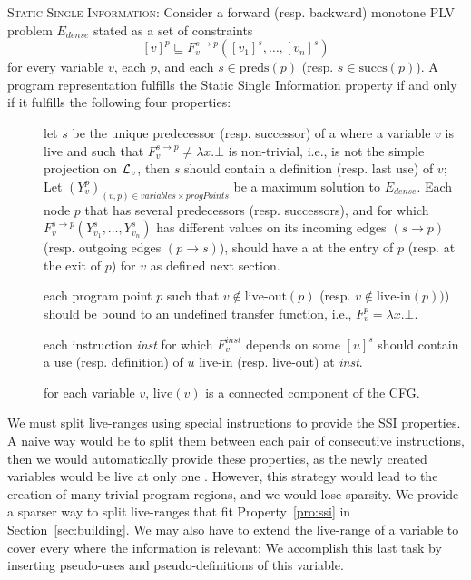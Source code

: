 {\begin{property}[SSI]
\label{pro:ssi}\textsc{Static Single Information:}
Consider a forward (resp.  backward) monotone PLV problem $E_\textit{dense}$ 
stated as a set of constraints
$$[v]^p \sqsubseteq F_v^{s\to p}([v_1]^s,\dots,[v_n]^s)$$
for every variable $v$, each \progpoint $p$, and each $s \in \textrm{preds}(p)$ 
(resp.  $s\in \textrm{succs}(p)$).
A program representation fulfills the Static Single Information property if and 
only if it fulfills the following four properties:

\begin{description}
\item[\bf\psplit] let $s$ be the unique predecessor (resp. successor) of 
  a \progpoint where a variable $v$ is live and such that $F_v^{s\to p}\neq 
  \lambda x.\bot$ is non-trivial, i.e., is not the simple projection on ${\cal 
  L}_v$, then $s$ should contain a definition (resp. last use) of $v$; Let 
  $(Y_v^p)_{(v,p)\in \textit{variables}\times \textit{progPoints}}$ be 
  a maximum solution to $E_\textit{dense}$.  Each node $p$ that has several 
  predecessors (resp. successors), and for which $F_v^{s\to 
  p}(Y_{v_1}^s,\dots,Y_{v_n}^s)$ has different values on its incoming edges 
  $(s\to p)$ (resp. outgoing edges $(p\to s)$), should have a \phifun at the 
  entry of $p$ (resp. \sigmafun at the exit of $p$) for $v$
  as defined next section.
\item[\bf \pinfo] each program point $p$ such that $v\not\in 
    \textrm{live-out}(p)$ (resp. $v\not\in \textrm{live-in}(p))$)  should be 
    bound to an undefined  transfer function, i.e., $F_v^p=\lambda x.\bot$.
\item[\bf \plink] each instruction \textit{inst} for which 
  $F_v^{\textit{inst}}$ depends on some $[u]^s$ should contain a use (resp.  
  definition) of $u$ live-in (resp. live-out) at
\textit{inst}.
\item[\bf \pversion] for each variable $v$, $\textrm{live}(v)$ is a connected 
  component of the CFG.
\end{description}
\end{property}

We must split live-ranges using special instructions to provide the SSI 
properties.
A naive way would be to split them between each pair of consecutive 
instructions, then we would automatically provide these properties, as the 
newly created variables would be live at only one \progpoint.
However, this strategy would lead to the creation of many trivial program regions, and we would lose sparsity.
We provide a sparser way to split live-ranges that fit Property~\ref{pro:ssi} 
in Section~\ref{sec:building}.
We may also have to extend the live-range of a variable to cover every 
\progpoint where the information is relevant;
We accomplish this last task by inserting pseudo-uses and pseudo-definitions of 
this variable.

}
